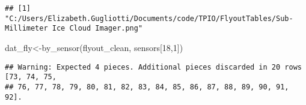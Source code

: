 \documentclass[
]{article}
\newenvironment{Shaded}{\begin{snugshade}}{\end{snugshade}}
\newcommand{\DecValTok}[1]{\textcolor[rgb]{0.00,0.00,0.81}{#1}}
\newcommand{\FunctionTok}[1]{\textcolor[rgb]{0.00,0.00,0.00}{#1}}
\newcommand{\NormalTok}[1]{#1}
\newcommand{\OtherTok}[1]{\textcolor[rgb]{0.56,0.35,0.01}{#1}}
\begin{document}
\begin{verbatim}
## [1] "C:/Users/Elizabeth.Gugliotti/Documents/code/TPIO/FlyoutTables/Sub-Millimeter Ice Cloud Imager.png"
\end{verbatim}

\begin{Shaded}
\begin{Highlighting}[]
\NormalTok{dat\_fly}\OtherTok{\textless{}{-}}\FunctionTok{by\_sensor}\NormalTok{(flyout\_clean, sensors[}\DecValTok{18}\NormalTok{,}\DecValTok{1}\NormalTok{])}
\end{Highlighting}
\end{Shaded}

\begin{verbatim}
## Warning: Expected 4 pieces. Additional pieces discarded in 20 rows [73, 74, 75,
## 76, 77, 78, 79, 80, 81, 82, 83, 84, 85, 86, 87, 88, 89, 90, 91, 92].
\end{verbatim}
\end{document}
